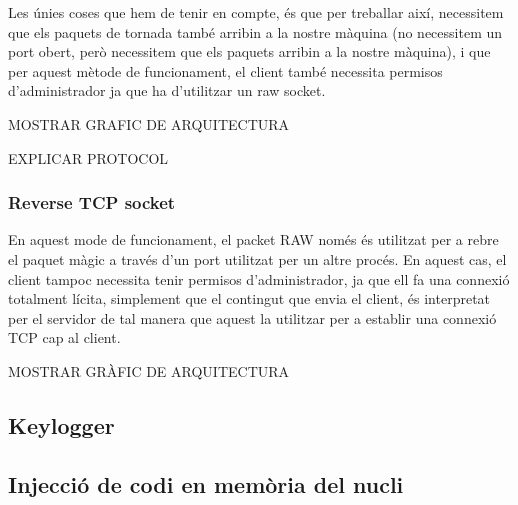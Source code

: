 Les únies coses que hem de tenir en compte, és que per treballar així, necessitem que els paquets de tornada també arribin a la nostre màquina 
(no necessitem un port obert, però necessitem que els paquets arribin a la nostre màquina), i que per aquest mètode de funcionament, el client 
també necessita permisos d'administrador ja que ha d'utilitzar un raw socket.

MOSTRAR GRAFIC DE ARQUITECTURA

EXPLICAR PROTOCOL


\subsubsection{Reverse TCP socket}
En aquest mode de funcionament, el packet RAW només és utilitzat per a rebre el paquet màgic a través d'un port utilitzat per un altre procés. En aquest 
cas, el client tampoc necessita tenir permisos d'administrador, ja que ell fa una connexió totalment lícita, simplement que el contingut que envia
el client, és interpretat per el servidor de tal manera que aquest la utilitzar per a establir una connexió TCP cap al client.

MOSTRAR GRÀFIC DE ARQUITECTURA

\subsection{Keylogger}
\subsection{Injecció de codi en memòria del nucli}



